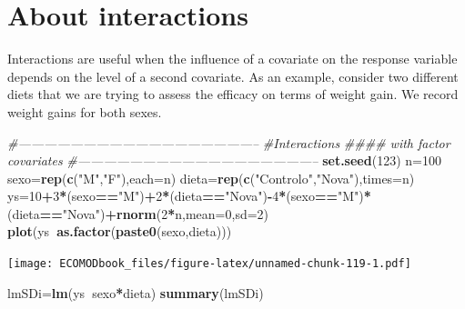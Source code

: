 \documentclass[
]{book}
\newenvironment{Shaded}{\begin{snugshade}}{\end{snugshade}}
\newcommand{\CommentTok}[1]{\textcolor[rgb]{0.56,0.35,0.01}{\textit{#1}}}
\newcommand{\DataTypeTok}[1]{\textcolor[rgb]{0.13,0.29,0.53}{#1}}
\newcommand{\DecValTok}[1]{\textcolor[rgb]{0.00,0.00,0.81}{#1}}
\newcommand{\KeywordTok}[1]{\textcolor[rgb]{0.13,0.29,0.53}{\textbf{#1}}}
\newcommand{\NormalTok}[1]{#1}
\newcommand{\OperatorTok}[1]{\textcolor[rgb]{0.81,0.36,0.00}{\textbf{#1}}}
\newcommand{\StringTok}[1]{\textcolor[rgb]{0.31,0.60,0.02}{#1}}
\begin{document}
\hypertarget{about-interactions}{%
\section{About interactions}\label{about-interactions}}

Interactions are useful when the influence of a covariate on the response variable depends on the level of a second covariate. As an example, consider two different diets that we are trying to assess the efficacy on terms of weight gain. We record weight gains for both sexes.

\begin{Shaded}
\begin{Highlighting}[]
\CommentTok{#--------------------------------------------------------}
\CommentTok{#Interactions}
\CommentTok{#### with factor covariates}
\CommentTok{#--------------------------------------------------------}
\KeywordTok{set.seed}\NormalTok{(}\DecValTok{123}\NormalTok{)}
\NormalTok{n=}\DecValTok{100}
\NormalTok{sexo=}\KeywordTok{rep}\NormalTok{(}\KeywordTok{c}\NormalTok{(}\StringTok{"M"}\NormalTok{,}\StringTok{"F"}\NormalTok{),}\DataTypeTok{each=}\NormalTok{n)}
\NormalTok{dieta=}\KeywordTok{rep}\NormalTok{(}\KeywordTok{c}\NormalTok{(}\StringTok{"Controlo"}\NormalTok{,}\StringTok{"Nova"}\NormalTok{),}\DataTypeTok{times=}\NormalTok{n)}
\NormalTok{ys=}\DecValTok{10}\OperatorTok{+}\DecValTok{3}\OperatorTok{*}\NormalTok{(sexo}\OperatorTok{==}\StringTok{"M"}\NormalTok{)}\OperatorTok{+}\DecValTok{2}\OperatorTok{*}\NormalTok{(dieta}\OperatorTok{==}\StringTok{"Nova"}\NormalTok{)}\OperatorTok{-}\DecValTok{4}\OperatorTok{*}\NormalTok{(sexo}\OperatorTok{==}\StringTok{"M"}\NormalTok{)}\OperatorTok{*}\NormalTok{(dieta}\OperatorTok{==}\StringTok{"Nova"}\NormalTok{)}\OperatorTok{+}\KeywordTok{rnorm}\NormalTok{(}\DecValTok{2}\OperatorTok{*}\NormalTok{n,}\DataTypeTok{mean=}\DecValTok{0}\NormalTok{,}\DataTypeTok{sd=}\DecValTok{2}\NormalTok{)}
\KeywordTok{plot}\NormalTok{(ys}\OperatorTok{~}\KeywordTok{as.factor}\NormalTok{(}\KeywordTok{paste0}\NormalTok{(sexo,dieta)))}
\end{Highlighting}
\end{Shaded}

\texttt{[image: ECOMODbook\_files/figure-latex/unnamed-chunk-119-1.pdf]}

\begin{Shaded}
\begin{Highlighting}[]
\NormalTok{lmSDi=}\KeywordTok{lm}\NormalTok{(ys}\OperatorTok{~}\NormalTok{sexo}\OperatorTok{*}\NormalTok{dieta)}
\KeywordTok{summary}\NormalTok{(lmSDi)}
\end{Highlighting}
\end{Shaded}
\end{document}

